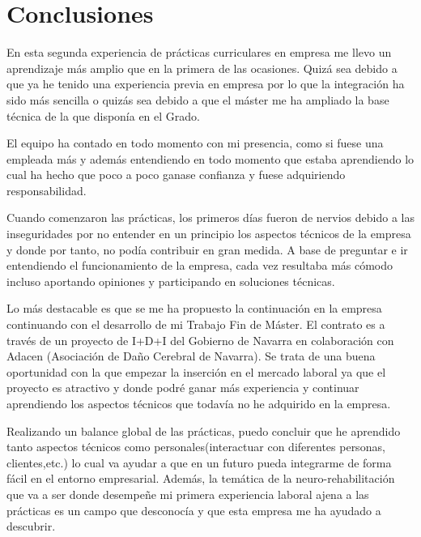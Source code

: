 \chapter{Conclusiones \label{sec:conclusiones}}


En esta segunda experiencia de prácticas curriculares en empresa me llevo un aprendizaje más amplio que en la primera de las ocasiones. Quizá sea debido a que ya he tenido una experiencia previa en empresa por lo que la integración ha sido más sencilla o quizás sea debido a que el máster me ha ampliado la base técnica de la que disponía en el Grado. 

El equipo ha contado en todo momento con mi presencia, como si fuese una empleada más y además entendiendo en todo momento que estaba aprendiendo lo cual ha hecho que poco a poco ganase confianza y fuese adquiriendo responsabilidad.

Cuando comenzaron las prácticas, los primeros días fueron de nervios debido a las inseguridades por no entender en un principio los aspectos técnicos de la empresa y donde por tanto, no podía contribuir en gran medida. A base de preguntar e ir entendiendo el funcionamiento de la empresa, cada vez resultaba más cómodo incluso aportando opiniones y participando en soluciones técnicas.

Lo más destacable es que se me ha propuesto la continuación en la empresa continuando con el desarrollo de mi Trabajo Fin de Máster. El contrato es a través de un proyecto de I+D+I del Gobierno de Navarra en colaboración con Adacen (Asociación de Daño Cerebral de Navarra). Se trata de una buena oportunidad con la que empezar la inserción en el mercado laboral ya que el proyecto es atractivo y donde podré ganar más experiencia y continuar aprendiendo los aspectos técnicos que todavía no he adquirido en la empresa.

Realizando un balance global de las prácticas, puedo concluir que he aprendido tanto aspectos técnicos como personales(interactuar con diferentes personas, clientes,etc.) lo cual va  ayudar a que en un futuro pueda integrarme de forma fácil en el entorno empresarial. Además, la temática de la neuro-rehabilitación que va a ser donde desempeñe mi primera experiencia laboral ajena a las prácticas es un campo que desconocía y que esta empresa me ha ayudado a descubrir.